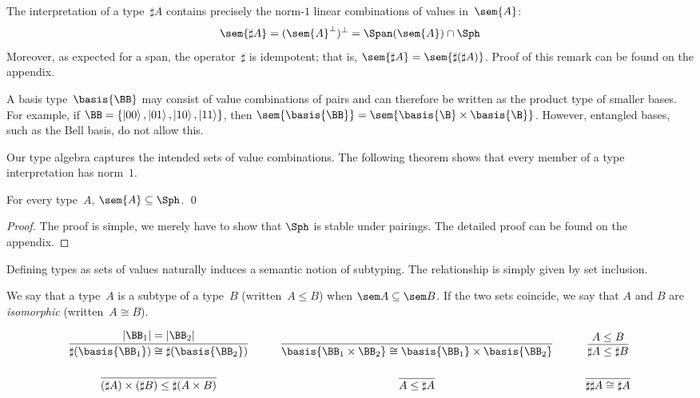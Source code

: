 \begin{remark}\label{rem:SharpCharacterization}\label{rem:IdempotentSharp}
  The interpretation of a type~$\sharp A$ contains precisely the
  norm-$1$ linear combinations of values in~$\sem{A}$:
  \[
    \sem{\sharp A}
    = (\sem{A}^\bot)^\bot
    = \Span(\sem{A}) \cap \Sph
  \]
  Moreover, as expected for a span, the operator~$\sharp$ is idempotent;
  that is, $\sem{\sharp A} = \sem{\sharp(\sharp A)}$. Proof of this
  remark can be found on the appendix.
\end{remark}

\begin{remark}
  A basis type~$\basis{\BB}$ may consist of value combinations of pairs and can
  therefore be written as the product type of smaller bases. For example, if
  $\BB=\{\ket{00},\ket{01},\ket{10},\ket{11}\}$, then $\sem{\basis{\BB}}=\sem{\basis{\B}\times\basis{\B}}$.
  However, entangled bases, such as the Bell basis, do not allow this.
\end{remark}

Our type algebra captures the intended sets of
value combinations. The following theorem shows that every member of a type
interpretation has norm~$1$.

\begin{theorem}\label{prop:UnitaryTypes}
  For every type~$A$, $\sem{A}\subseteq\Sph$.
  \qed
\end{theorem}
\begin{proof}
  The proof is simple, we merely have to show that $\Sph$ is stable under pairings. The detailed proof can be found on the appendix.
\end{proof}

Defining types as sets of values naturally induces a semantic notion of
subtyping. The relationship is simply given by set inclusion. 
\begin{definition}\label{def:Subtyping}
We say that a type~$A$ is a subtype of a type~$B$
(written~$A\leq B$) when $\sem A\subseteq\sem B$. 
If the two sets coincide, we say that $A$ and $B$ are \emph{isomorphic}
(written~$A\cong B$).
\end{definition}

\begin{table}[t]
  \centering
  \[
  \begin{array}{c@{\qquad\quad}c@{\qquad\quad}c}
    \infer{\sharp (\basis{\BB_1})\cong\sharp(\basis{\BB_2})}{|\BB_1| = |\BB_2|} &
    \infer{\basis{\BB_1\times \BB_2} \cong \basis{\BB_1}\times\basis{\BB_2}}{} &
    \infer{\sharp A \leq \sharp B}{A\leq B} \\[15pt]
    \infer{(\sharp A)\times(\sharp B)\leq\sharp(A\times B)}{}&
    {\infer{A\leq \sharp A}{}} &
    {\infer{\sharp\sharp A \cong \sharp A}{}}
  \end{array}
  \]
  \caption{Some valid subtyping rules.}
  \label{tab:Subtyping}
\end{table}

